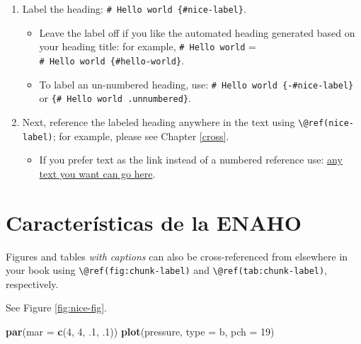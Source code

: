 \documentclass[
]{book}
\newenvironment{Shaded}{\begin{snugshade}}{\end{snugshade}}
\newcommand{\AttributeTok}[1]{\textcolor[rgb]{0.13,0.29,0.53}{#1}}
\newcommand{\DecValTok}[1]{\textcolor[rgb]{0.00,0.00,0.81}{#1}}
\newcommand{\FunctionTok}[1]{\textcolor[rgb]{0.13,0.29,0.53}{\textbf{#1}}}
\newcommand{\NormalTok}[1]{#1}
\newcommand{\StringTok}[1]{\textcolor[rgb]{0.31,0.60,0.02}{#1}}
\providecommand{\tightlist}{%
  \setlength{\itemsep}{0pt}\setlength{\parskip}{0pt}}
\theoremstyle{definition}
\theoremstyle{definition}
\theoremstyle{definition}
\theoremstyle{definition}
\theoremstyle{remark}
\begin{document}
\begin{enumerate}
\def\labelenumi{\arabic{enumi}.}
\tightlist
\item
  Label the heading: \texttt{\#\ Hello\ world\ \{\#nice-label\}}.

  \begin{itemize}
  \tightlist
  \item
    Leave the label off if you like the automated heading generated based on your heading title: for example, \texttt{\#\ Hello\ world} = \texttt{\#\ Hello\ world\ \{\#hello-world\}}.
  \item
    To label an un-numbered heading, use: \texttt{\#\ Hello\ world\ \{-\#nice-label\}} or \texttt{\{\#\ Hello\ world\ .unnumbered\}}.
  \end{itemize}
\item
  Next, reference the labeled heading anywhere in the text using \texttt{\textbackslash{}@ref(nice-label)}; for example, please see Chapter \ref{cross}.

  \begin{itemize}
  \tightlist
  \item
    If you prefer text as the link instead of a numbered reference use: \protect\hyperlink{cross}{any text you want can go here}.
  \end{itemize}
\end{enumerate}

\hypertarget{caracteruxedsticas-de-la-enaho}{%
\section{Características de la ENAHO}\label{caracteruxedsticas-de-la-enaho}}

Figures and tables \emph{with captions} can also be cross-referenced from elsewhere in your book using \texttt{\textbackslash{}@ref(fig:chunk-label)} and \texttt{\textbackslash{}@ref(tab:chunk-label)}, respectively.

See Figure \ref{fig:nice-fig}.

\begin{Shaded}
\begin{Highlighting}[]
\FunctionTok{par}\NormalTok{(}\AttributeTok{mar =} \FunctionTok{c}\NormalTok{(}\DecValTok{4}\NormalTok{, }\DecValTok{4}\NormalTok{, .}\DecValTok{1}\NormalTok{, .}\DecValTok{1}\NormalTok{))}
\FunctionTok{plot}\NormalTok{(pressure, }\AttributeTok{type =} \StringTok{\textquotesingle{}b\textquotesingle{}}\NormalTok{, }\AttributeTok{pch =} \DecValTok{19}\NormalTok{)}
\end{Highlighting}
\end{Shaded}
\end{document}

